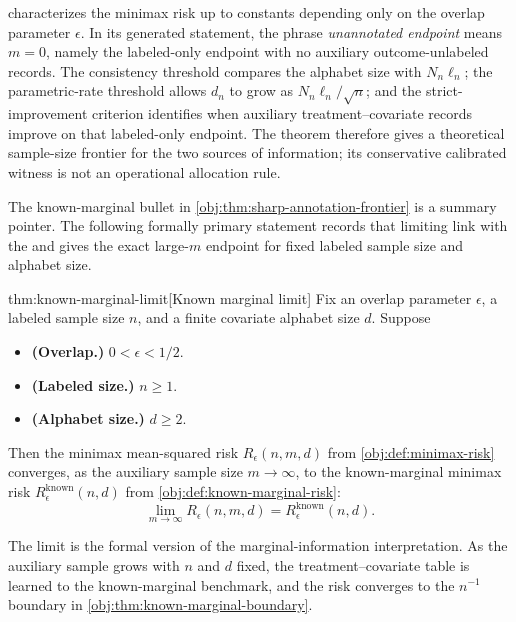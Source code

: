  characterizes the minimax risk up to constants depending only on the overlap parameter \(\epsilon\). In its generated statement, the phrase \emph{unannotated endpoint} means \(m=0\), namely the labeled-only endpoint with no auxiliary outcome-unlabeled records. The consistency threshold compares the alphabet size with \(N_n\ell_n\); the parametric-rate threshold allows \(d_n\) to grow as \(N_n\ell_n/\sqrt n\); and the strict-improvement criterion identifies when auxiliary treatment--covariate records improve on that labeled-only endpoint. The theorem therefore gives a theoretical sample-size frontier for the two sources of information; its conservative calibrated witness is not an operational allocation rule.

The known-marginal bullet in \cref{obj:thm:sharp-annotation-frontier} is a summary pointer. The following formally primary statement records that limiting link with the  and gives the exact large-\(m\) endpoint for fixed labeled sample size and alphabet size.

\begin{theoremv}{thm:known-marginal-limit}[Known marginal limit]
Fix an overlap parameter \(\epsilon\), a labeled sample size \(n\), and a finite covariate alphabet size \(d\). Suppose
\begin{itemize}
\item \textbf{(Overlap.)} \(0<\epsilon<1/2\).
\item \textbf{(Labeled size.)} \(n\ge 1\).
\item \textbf{(Alphabet size.)} \(d\ge 2\).
\end{itemize}
Then the minimax mean-squared risk \(R_\epsilon(n,m,d)\) from \cref{obj:def:minimax-risk} converges, as the auxiliary sample size \(m\to\infty\), to the known-marginal minimax risk \(R_\epsilon^{\mathrm{known}}(n,d)\) from \cref{obj:def:known-marginal-risk}:
\[
\lim_{m\to\infty} R_\epsilon(n,m,d)
=
R_\epsilon^{\mathrm{known}}(n,d).
\]
\end{theoremv}

The limit is the formal version of the marginal-information interpretation. As the auxiliary sample grows with \(n\) and \(d\) fixed, the treatment--covariate table is learned to the known-marginal benchmark, and the risk converges to the \(n^{-1}\) boundary in \cref{obj:thm:known-marginal-boundary}.
